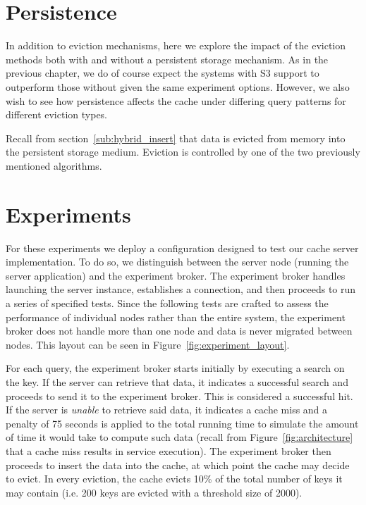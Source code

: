 
\section{Persistence} %
\label{sec:persistence}
In addition to eviction mechanisms, here we explore the impact of the eviction
methods both with and without a persistent storage mechanism. As in the
previous chapter, we do of course expect the systems with S3 support to
outperform those without given the same experiment options. However, we also
wish to see how persistence affects the cache under differing query patterns
for different eviction types.

Recall from section~\ref{sub:hybrid_insert} that data is evicted from memory
into the persistent storage medium. Eviction is controlled by one of the two
previously mentioned algorithms.


\section{Experiments} %
\label{sec:experiments_eviction}
For these experiments we deploy a configuration designed to test our cache
server implementation. To do so, we distinguish between the server node
(running the server application) and the experiment broker. The experiment
broker handles launching the server instance, establishes a connection, and
then proceeds to run a series of specified tests. Since the following tests are
crafted to assess the performance of individual nodes rather than the entire
system, the experiment broker does not handle more than one node and data is
never migrated between nodes. This layout can be seen in
Figure~\ref{fig:experiment_layout}.

For each query, the experiment broker starts initially by executing a search on
the key. If the server can retrieve that data, it indicates a successful search
and proceeds to send it to the experiment broker. This is considered a
successful hit. If the server is \emph{unable} to retrieve said data, it
indicates a cache miss and a penalty of 75 seconds is applied to the total
running time to simulate the amount of time it would take to compute such data
(recall from Figure~\ref{fig:architecture} that a cache miss results in service
execution). The experiment broker then proceeds to insert the data into the
cache, at which point the cache may decide to evict. In every eviction, the
cache evicts 10\% of the total number of keys it may contain (i.e. 200 keys are
evicted with a threshold size of 2000).

